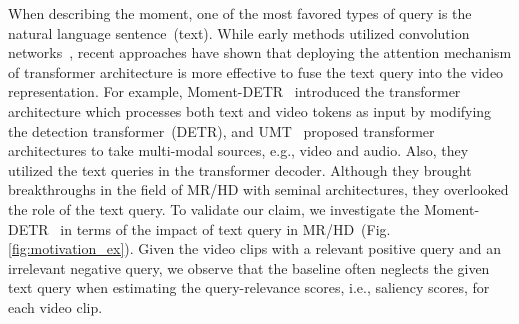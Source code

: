 When describing the moment, one of the most favored types of query is the natural language sentence~(text)\cite{anne2017localizing}. 
While early methods utilized convolution networks~\cite{zhang2020learning, gao2021fast, wang2020temporally}, recent approaches have shown that deploying the attention mechanism of transformer architecture is more effective to fuse the text query into the video representation.
For example, Moment-DETR~\cite{momentdetr} introduced the transformer architecture which processes both text and video tokens as input by modifying the detection transformer~(DETR), and UMT~\cite{umt} proposed transformer architectures to take multi-modal sources, e.g., video and audio. 
Also, they utilized the text queries in the transformer decoder.
Although they brought breakthroughs in the field of MR/HD with seminal architectures, they overlooked the role of the text query.
To validate our claim, we investigate the Moment-DETR~\cite{momentdetr} in terms of the impact of text query in MR/HD~(Fig.\ref{fig:motivation_ex}).
Given the video clips with a relevant positive query and an irrelevant negative query, we observe that the baseline often neglects the given text query when estimating the query-relevance scores, i.e., saliency scores, for each video clip.
























